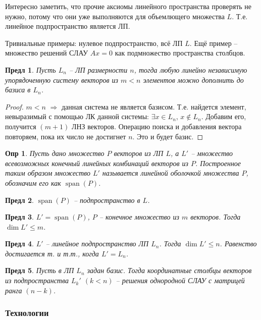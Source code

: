 \documentclass[a4paper,12pt]{article}
\DeclareMathOperator{\spn}{\mathop{span}}
\newtheorem*{definition}{Опр}
\newtheorem{propos}{Предл}[section]
\begin{document}
Интересно заметить, что прочие аксиомы линейного пространства проверять не нужно, потому что они уже выполняются для объемлющего множества $L$. Т.е. линейное подпространство является ЛП. 

Тривиальные примеры: нулевое подпространство, всё ЛП $L$. Ещё пример -- множество решений СЛАУ $Ax = 0$ как подмножество пространства столбцов.

\begin{propos}
	Пусть $L_n$ -- ЛП размерности $n$, тогда любую линейно независимую упорядоченную систему векторов из $m < n$ элементов можно дополнить до базиса в $L_n$.
\end{propos}

\begin{proof}	
	$m < n$ $\Rightarrow$ данная система не является базисом. Т.е. найдется элемент, невыразимый с помощью ЛК данной системы: $\exists x \in L_n$, $x \not \in L_n$. Добавим его, получится $(m+1)$ ЛНЗ векторов. Операцию поиска и добавления вектора повторяем, пока их число не достигнет $n$. Это и будет базис.
\end{proof}

\begin{definition}
	Пусть дано множество $P$ векторов из ЛП $L$, а $L'$ -- множество всевозможных конечный линейных комбинаций векторов из $P$. Построенное таким образом множество $L'$ называется линейной оболочкой множества $P$, обозначим его как $\spn(P)$.
\end{definition}

\begin{propos}
	$\spn(P)$ -- подпространство в $L$.
\end{propos}

\begin{propos}
	$L' = \spn(P)$, $P$ -- конечное множество из $m$ векторов. Тогда $\dim L' \le m$.  
\end{propos}

\begin{propos}
	$L'$ -- линейное подпространство ЛП $L_n$. Тогда $\dim L' \le n$. Равенство достигается т. и т.т., когда $L' = L_n$.
\end{propos}

\begin{propos}
	Пусть в ЛП $L_n$ задан базис. Тогда координатные столбцы векторов из подпространства $L_k'$ $(k < n)$ -- решения однородной СЛАУ с матрицей ранга $(n-k)$.
\end{propos}

\subsubsection{Технологии}
\end{document}

